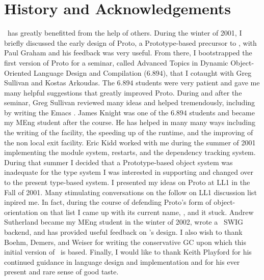 \documentclass[twoside,twocolumn,9pt]{extarticle}
\begin{document}
\section{History and Acknowledgements} 

\goo\ has greatly benefitted from the help of others.  During the
winter of 2001, I briefly discussed the early design of Proto, a
Prototype-based precursor to \goo, with Paul Graham and his feedback
was very useful.  From there, I bootstrapped the first version of
Proto for a seminar, called Advanced Topics in Dynamic Object-Oriented
Language Design and Compilation ($6.894$), that I cotaught with Greg
Sullivan and Kostas Arkoudas.  The $6.894$ students were very patient
and gave me many helpful suggestions that greatly improved Proto.
During and after the seminar, Greg Sullivan reviewed many ideas and
helped tremendously, including by writing the Emacs .  
James Knight was one of the $6.894$ students and
became my MEng student after the course.  He has helped in many many
ways including the writing of the  facility, the
speeding up of the runtime, and the improving of the non local exit
facility.  Eric Kidd worked with me during the summer of 2001
implementing the module system, restarts, and the dependency tracking
system.  During that summer I decided that a Prototype-based object
system was inadequate for the type system I was interested in
supporting and changed over to the present type-based system.  I
presented my ideas on Proto at LL1 in the Fall of 2001.  Many
stimulating conversations on the follow on LL1 discussion list inpired
me.  In fact, during the course of defending Proto's form of
object-orientation on that list I came up with its current name, \goo,
and it stuck.  Andrew Sutherland became my MEng student in the winter
of 2002, wrote a \goo\ SWIG~\cite{Beaz96a} backend, and has provided
useful feedback on \goo's design.  I also wish to thank Boehm, Demers,
and Weiser for writing the conservative GC upon which this initial
version of \goo\ is based.  Finally, I would like to thank
Keith Playford for his continued guidance in language design and
implementation and for his ever present and rare sense of good taste.

% 
% 
% 
% 
\end{document}
